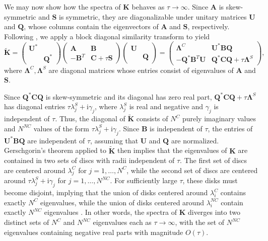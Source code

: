 \documentclass[preprint,10pt]{elsarticle}
\newcommand{\mi}{\mathrm{i}} %
\newcommand{\note}[1]{{\color{blue}#1}}
\begin{document}
We may now show how the spectra of $\bm{K}$ behaves as $\tau \rightarrow \infty$.  Since $\bm{A}$ is skew-symmetric and $\bm{S}$ is symmetric, they are diagonalizable under unitary matrices $\bm{U}$ and $\bm{Q}$, whose columns contain the eigenvectors of $\bm{A}$ and $\bm{S}$, respectively.   
Following \cite{Warburton20063205}, we apply a block diagonal similarity transform to yield
\[
\tilde{\bm{K}} = \left(\begin{array}{cc}
\bm{U}^* & \\
& \bm{Q}^*
\end{array}\right)
\left(\begin{array}{cc}
\bm{A} & \bm{B}\\
-\bm{B}^T & \bm{C} + \tau \bm{S}
\end{array}\right)
\left(\begin{array}{cc}
\bm{U} & \\
& \bm{Q}
\end{array}\right)
 = \left(\begin{array}{cc}
\bm{\Lambda}^C & \bm{U}^*\bm{B}\bm{Q}\\
-\bm{Q}^*\bm{B}^T\bm{U} & \bm{Q}^*\bm{C}\bm{Q} + \tau \bm{\Lambda}^{S}
\end{array}\right),
\]
where $\bm{\Lambda}^C,\bm{\Lambda}^{S}$ are diagonal matrices whose entries consist of eigenvalues of $\bm{A}$ and $\bm{S}$.  

Since $\bm{Q}^*\bm{C}\bm{Q}$ is skew-symmetric and its diagonal has zero real part, $\bm{Q}^*\bm{C}\bm{Q} + \tau \bm{\Lambda}^{S}$ has diagonal entries $\tau \lambda^S_j + \mi\gamma_j$, where $\lambda^S_j$ is real and negative and $\gamma_j$ is independent of $\tau$.  Thus, the diagonal of $\tilde{\bm{K}}$ consists of $N^C$ purely imaginary values and $N^{NC}$ values of the form $\tau \lambda^S_j + \mi\gamma_j$.  Since $\bm{B}$ is independent of $\tau$, the entries of $\bm{U}^*\bm{B}\bm{Q}$ are independent of $\tau$, assuming that $\bm{U}$ and $\bm{Q}$ are normalized.  Gerschgorin's theorem applied to $\tilde{\bm{K}}$ then implies that the eigenvalues of $\bm{K}$ are contained in two sets of discs with radii independent of $\tau$.  The first set of discs are centered around $\lambda^C_j$ for $j = 1,\ldots,N^C$, while the second set of discs are centered around $\tau\lambda^S_j + \mi\gamma_j$ for $j = 1,\ldots,N^{NC}$. For sufficiently large $\tau$, these disks must become disjoint, implying that the union of disks centered around  $\lambda^C_i$ contains exactly $N^C$ eigenvalues, while the union of disks centered around  $\lambda^{NC}_i$ contain exactly $N^{NC}$ eigenvalues \cite{horn2012matrix}.  In other words, the spectra of $\bm{K}$ diverges into two distinct sets of $N^C$ and $N^{NC}$ eigenvalues each as $\tau \rightarrow \infty$, with the set of $N^{NC}$ eigenvalues containing negative real parts with magnitude $O(\tau)$.  
\end{document}
